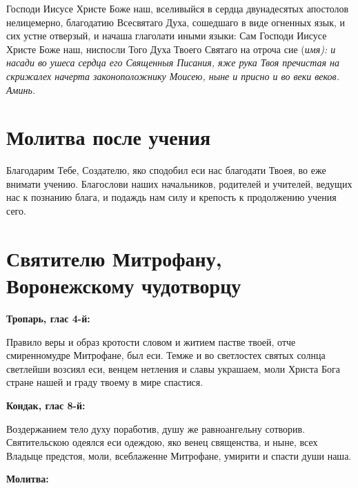 Господи Иисусе Христе Боже наш, вселивыйся в сердца двунадесятых апостолов нелицемерно, благодатию Всесвятаго Духа, сошедшаго в виде огненных язык, и сих устне отверзый, и начаша глаголати иными языки: Сам Господи Иисусе Христе Боже наш, ниспосли Того Духа Твоего Святаго на отроча сие (\itshape имя\normalfont{}): и насади во ушеса сердца его Священныя Писания, яже рука Твоя пречистая на скрижалех начерта законоположнику Моисею, ныне и присно и во веки веков. Аминь.

\section{Молитва после учения}
 


Благодарим Тебе, Создателю, яко сподобил еси нас благодати Твоея, во еже внимати учению. Благослови наших начальников, родителей и учителей, ведущих нас к познанию блага, и подаждь нам силу и крепость к продолжению учения сего.


\bigskip\bigskip\mychapterending


 

\section{Святителю Митрофану, Воронежскому чудотворцу}
 
\bfseries Тропарь, глас 4-й:\normalfont{}


Правило веры и образ кротости словом и житием пастве твоей, отче смиренномудре Митрофане, был еси. Темже и во светлостех святых солнца светлейши возсиял еси, венцем нетления и славы украшаем, моли Христа Бога стране нашей и граду твоему в мире спастися.

\medskip
\bfseries Кондак, глас 8-й:\normalfont{}


Воздержанием тело духу поработив, душу же равноангельну сотворив. Святительскою одеялся еси одеждою, яко венец священства, и ныне, всех Владыце предстоя, моли, всеблаженне Митрофане, умирити и спасти души наша.

\medskip
\bfseries Молитва:\normalfont{}


